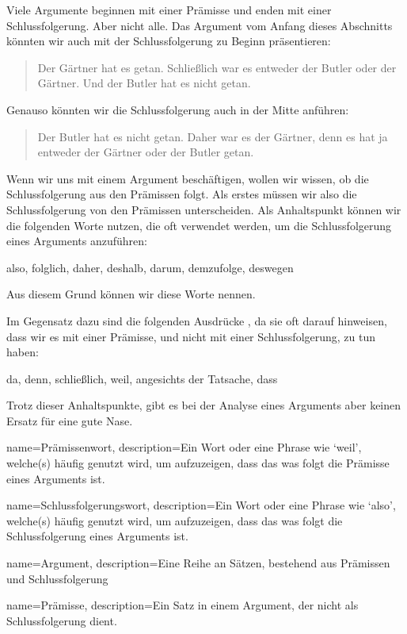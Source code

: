 Viele Argumente beginnen mit einer Prämisse und enden mit einer Schlussfolgerung. Aber nicht alle. Das Argument vom Anfang dieses Abschnitts könnten wir auch mit der Schlussfolgerung zu Beginn präsentieren:
	\begin{quote}
		Der Gärtner hat es getan. Schlie{\ss}lich war es entweder der Butler oder der Gärtner. Und der Butler hat es nicht getan. 
	\end{quote}
Genauso könnten wir die Schlussfolgerung auch in der Mitte anführen:
	\begin{quote}
		Der Butler hat es nicht getan. Daher war es der Gärtner, denn es hat ja entweder der Gärtner oder der Butler getan.
	\end{quote}
Wenn wir uns mit einem Argument beschäftigen, wollen wir wissen, ob die Schlussfolgerung aus den Prämissen folgt. Als erstes müssen wir also die Schlussfolgerung von den Prämissen unterscheiden. Als Anhaltspunkt können wir die folgenden Worte nutzen, die oft verwendet werden, um die Schlussfolgerung eines Arguments anzuführen:
	\begin{center}
		also, folglich, daher, deshalb, darum, demzufolge, deswegen
	\end{center}
Aus diesem Grund können wir diese Worte  nennen.

Im Gegensatz dazu sind die folgenden Ausdrücke , da sie oft darauf hinweisen, dass wir es mit einer Prämisse, und nicht mit einer Schlussfolgerung, zu tun haben:
	\begin{center}
		da, denn, schlie{\ss}lich, weil, angesichts der Tatsache, dass
	\end{center}
Trotz dieser Anhaltspunkte, gibt es bei der Analyse eines Arguments aber keinen Ersatz für eine gute Nase. 

{
name=Prämissenwort,
description={Ein Wort oder eine Phrase wie `weil', welche(s) häufig genutzt wird, um aufzuzeigen, dass das was folgt die Prämisse eines Arguments ist.}
}

{
name=Schlussfolgerungswort,
description={Ein Wort oder eine Phrase wie `also', welche(s) häufig genutzt wird, um aufzuzeigen, dass das was folgt die Schlussfolgerung eines Arguments ist.}
}

{
name=Argument,
description={Eine Reihe an Sätzen, bestehend aus \gls{Prämisse}n und \gls{Schlussfolgerung}}
}

{
name=Prämisse,
description={Ein Satz in einem \gls{Argument}, der nicht als \gls{Schlussfolgerung} dient.}
}

